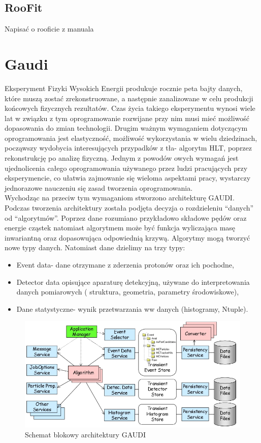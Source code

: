  \subsection{RooFit}
 Napisać o rooficie z manuala
 \section{Gaudi}
 Eksperyment Fizyki Wysokich Energii produkuje rocznie peta bajty danych, które muszą zostać zrekonstruowane, a następnie zanalizowane w celu produkcji końcowych fizycznych rezultatów. Czas życia takiego eksperymentu wynosi wiele lat w związku z tym oprogramowanie rozwijane przy nim musi mieć możliwość dopasowania do zmian technologii. Drugim ważnym wymaganiem dotyczącym oprogramowania jest elastyczność, możliwość wykorzystania w wielu dziedzinach, począwszy wydobycia interesujących przypadków z tła- algorytm HLT, poprzez rekonstrukcję po analizę fizyczną. Jednym z powodów owych wymagań jest ujednolicenia całego oprogramowania używanego przez ludzi pracujących przy eksperymencie, co ułatwia  zajmowanie się wieloma aspektami pracy, wystarczy jednorazowe nauczeniu się zasad tworzenia oprogramowania.  \\
Wychodząc na przeciw tym wymaganiom stworzono architekturę GAUDI\cite{GAUDI}. Podczas tworzenia architektury została podjęta decyzja o rozdzieleniu ``danych'' od ``algorytmów''. Poprzez dane rozumiano przykładowo składowe pędów oraz energie cząstek natomiast algorytmem może być funkcja wyliczająca masę inwariantną oraz dopasowująca odpowiednią krzywą. Algorytmy mogą tworzyć nowe typy danych. Natomiast dane dzielimy na trzy typy:
\begin{itemize}
 \item Event data- dane otrzymane z zderzenia protonów oraz ich pochodne,
 \item Detector data opisujące aparaturę detekcyjną, używane do interpretowania danych pomiarowych ( struktura, geometria, parametry środowiskowe),
 \item Dane statystyczne- wynik przetwarzania ww danych (histogramy, Ntuple).
\end{itemize}
 \begin{figure}[h]
 \centering
 \includegraphics[scale=0.8]{rozdzial4/GAUDI.jpeg}
 \caption{Schemat blokowy architektury GAUDI\cite{GAUDI}}
 \label{rys:GAUDI architektura}
\end{figure}

